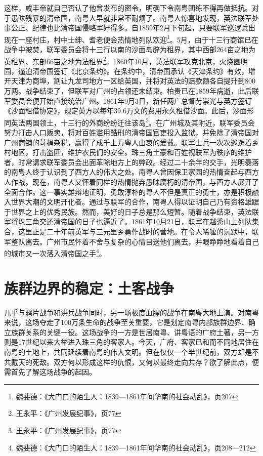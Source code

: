 这样，咸丰帝就自己否认了他曾发布的密令，明确下令南粤团练不得再做抵抗。对于愚昧残暴的清帝国，南粤人早就非常不耐烦了。南粤人惊喜地发现，英法联军处事公正、纪律也比清帝国侵略军好得多。自1859年2月下旬起，只要联军巡逻兵出现在一座村庄，村中士绅、耆老便会热情地列队欢迎\footnote{魏斐德：《大门口的陌生人：1839—1861年间华南的社会动乱》，页207}。5月，由于十三行商馆已在战争中被焚，联军委员会将十三行以南的沙面岛辟为租界，其中西部264亩之地为英租界、东部66亩之地为法租界\footnote{王永平：《广州发展纪事》，页77}。1860年10月，英法联军攻克北京，火烧圆明园，逼迫清帝国签订《北京条约》。在条约中，清帝国承认《天津条约》有效，增开天津为商埠，割让九龙司地方一区给英国，并将对英法的赔款额各自提升到800万两。战争结束了，但联军对广州的占领还未结束。柏贵已在1859年病逝，此后联军委员会便开始直接统治广州。1861年9月3日，新任两广总督劳崇光与英方签订《沙面租借协定》，规定英方以每年39.6万文的费用永久租借沙面。此后，沙面形同英法两国领土，十三行的外商纷纷迁往该岛\footnote{王永平：《广州发展纪事》，页77}。在广州城及其附近，联军委员会努力打击人口贩卖，将对百姓滥用酷刑的清帝国官吏投入监狱，并免除了清帝国对广州商铺的苛捐杂税，赢得了成千上万粤人由衷的爱戴。联军士兵一次次巡逻着乡村地区，打击盗匪，维护农民们的安全。珠三角土豪和百姓视联军为秩序的维护者，时常请求联军委员会出面革除地方上的弊政。经过二十余年的交手，光明磊落的南粤人终于认识到了西方人的伟大之处。南粤人曾因保卫家园的热情奋起与西方人作战。现在，南粤人又怀着同样的热情抛弃愚昧腐朽的清帝国，与西方人展开了全面合作。这一事实雄辩地证明，勇敢淳朴的粤人不但是真正的勇士，亦是积极融入世界大潮的文明开化者。通过与联军的合作，南粤人得以证明自己乃有资格雄踞于世界之上的优秀民族。然而，美好的日子总是那么短暂。随着战争结束，英法联军将珠三角交还清帝国的日子也逼近了。1861年10月21日，联军在越秀山上列队集合，这里正是二十年前英军与三元里乡勇作战时的营地。在令人唏嘘的沉默中，联军整队离去。广州市民怀着不舍与复杂的心情目送他们离去，并眼睁睁地看着自己的城市又一次落入清帝国之手\footnote{魏斐德：《大门口的陌生人：1839—1861年间华南的社会动乱》，页208—212}。

\section{族群边界的稳定：土客战争}

几乎与鸦片战争和洪兵战争同时，另一场极度血腥的战争在南粤大地上演。对南粤来说，这场夺走了100万条生命的战争至关重要，它是划定南粤内部族群边界、确立族群关系的关键一役。这场战争的一方是世居南粤、讲粤语的广府土著，另一方则是17世纪以来大举进入珠三角的客家人。今天，广府、客家已和而不同地居住在南粤的土地上，共同延续着南粤的伟大文明。但在仅仅一个半世纪前，双方却是不共戴天的死敌。双方何以形成这样的仇恨，又何以最终走向共存？欲了解此点，便需首先了解这场战争的起因。

